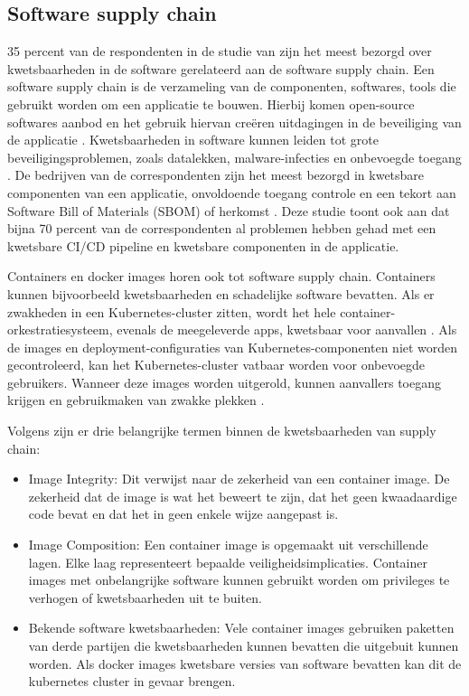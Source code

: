 \subsection{Software supply chain}
35 percent van de respondenten in de studie van \textcite{red-hat-2023} zijn het meest bezorgd over kwetsbaarheden in de software gerelateerd aan de software supply chain. Een software supply chain is de verzameling van de componenten, softwares, tools die gebruikt worden om een applicatie te bouwen. Hierbij komen open-source softwares aanbod en het gebruik hiervan creëren uitdagingen in de beveiliging van de applicatie \autocite{red-hat-2023}. Kwetsbaarheden in software kunnen leiden tot grote beveiligingsproblemen, zoals datalekken, malware-infecties en onbevoegde toegang \autocite{shamim2020xi}. De bedrijven van de correspondenten zijn het meest bezorgd in kwetsbare componenten van een applicatie, onvoldoende toegang controle en een tekort aan Software Bill of Materials (SBOM) of herkomst \autocite{red-hat-2023}. Deze studie toont ook aan dat bijna 70 percent van de correspondenten al problemen hebben gehad met een kwetsbare CI/CD pipeline en kwetsbare componenten in de applicatie. \newline

Containers en docker images horen ook tot software supply chain. Containers kunnen bijvoorbeeld kwetsbaarheden en schadelijke software bevatten. Als er zwakheden in een Kubernetes-cluster zitten, wordt het hele container-orkestratiesysteem, evenals de meegeleverde apps, kwetsbaar voor aanvallen \autocite{shamim2020xi}. Als de images en deployment-configuraties van Kubernetes-componenten niet worden gecontroleerd, kan het Kubernetes-cluster vatbaar worden voor onbevoegde gebruikers. Wanneer deze images worden uitgerold, kunnen aanvallers toegang krijgen en gebruikmaken van zwakke plekken \autocite{shamim2020xi}. \newline

Volgens \textcite{OWASP-2023} zijn er drie belangrijke termen binnen de kwetsbaarheden van supply chain:
\begin{itemize}
    \item Image Integrity: Dit verwijst naar de zekerheid van een container image. De zekerheid dat de image is wat het beweert te zijn, dat het geen kwaadaardige code bevat en dat het in geen enkele wijze aangepast is. 
    \item Image Composition: Een container image is opgemaakt uit verschillende lagen. Elke laag representeert bepaalde veiligheidsimplicaties. Container images met onbelangrijke software kunnen gebruikt worden om privileges te verhogen of kwetsbaarheden uit te buiten. 
    \item Bekende software kwetsbaarheden: Vele container images gebruiken paketten van derde partijen die kwetsbaarheden kunnen bevatten die uitgebuit kunnen worden. Als docker images kwetsbare versies van software bevatten kan dit de kubernetes cluster in gevaar brengen. 
\end{itemize}

